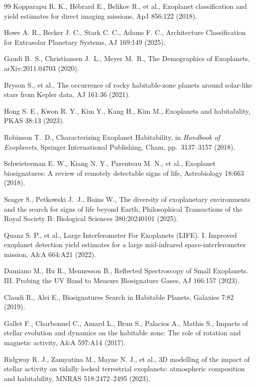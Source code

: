 \begin{thebibliography}{99}
Kopparapu R. K., H\'ebrard E., Belikov R., et al., Exoplanet classification and yield estimates for direct imaging missions, ApJ 856:122 (2018).

Howe A. R., Becker J. C., Stark C. C., Adams F. C., Architecture Classification for Extrasolar Planetary Systems, AJ 169:149 (2025).

Gaudi B.~S., Christiansen J.~L., Meyer M.~R.,
The Demographics of Exoplanets,
arXiv:2011.04703 (2020).

Bryson S., et al., The occurrence of rocky habitable-zone planets around solar-like stars from Kepler data, AJ 161:36 (2021).

Hong S. E., Kwon R. Y., Kim Y., Kang H., Kim M., Exoplanets and habitability, PKAS 38:13 (2023).

Robinson T.~D.,
Characterizing Exoplanet Habitability, in \textit{Handbook of Exoplanets},
Springer International Publishing, Cham, pp.~3137--3157 (2018).

Schwieterman E. W., Kiang N. Y., Parenteau M. N., et al., Exoplanet biosignatures: A review of remotely detectable signs of life, Astrobiology 18:663 (2018).

Seager S., Petkowski J.~J., Bains W.,
The diversity of exoplanetary environments and the search for signs of life beyond Earth,
Philosophical Transactions of the Royal Society B: Biological Sciences
380:20240101 (2025).

Quanz S. P., et al., Large Interferometer For Exoplanets (LIFE). I. Improved exoplanet detection yield estimates for a large mid-infrared space-interferometer mission, A\&A 664:A21 (2022).

Damiano M., Hu R., Mennesson B., Reflected Spectroscopy of Small Exoplanets. III. Probing the UV Band to Measure Biosignature Gases, AJ 166:157 (2023).

Claudi R., Alei E., Biosignatures Search in Habitable Planets, Galaxies 7:82 (2019).

Gallet F., Charbonnel C., Amard L., Brun S., Palacios A., Mathis S.,
Impacts of stellar evolution and dynamics on the habitable zone:
The role of rotation and magnetic activity,
A\&A 597:A14 (2017).

Ridgway R. J., Zamyatina M., Mayne N. J., et al., 3D modelling of the impact of stellar activity on tidally locked terrestrial exoplanets: atmospheric composition and habitability, MNRAS 518:2472--2495 (2023).


\end{thebibliography}
